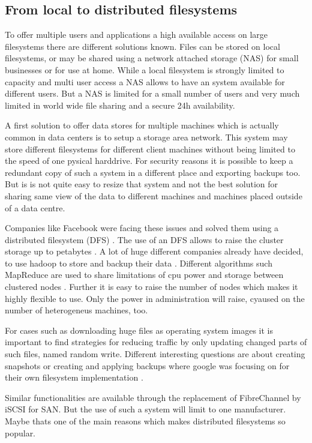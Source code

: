 \subsection{From local to distributed filesystems}

To offer multiple users and applications a high available access on large filesystems there are different solutions known. 
Files can be stored on local filesystems, or may be shared using a network attached storage (NAS) for small businesses or for use at home. 
While a local filesystem is strongly limited to capacity and multi user access a NAS allows to have an system available for different users. 
But a NAS is limited for a small number of users and very much limited in world wide file sharing and a secure 24h availability.

A first solution to offer data stores for multiple machines which is actually common in data centers is to setup a storage area network. 
This system may store different filesystems for different client machines without being limited to the speed of one pysical harddrive. 
For security reasons it is possible to keep a redundant copy of such a system in a different place and exporting backups too. 
But is is not quite easy to resize that system and not the best solution for sharing same view of the data to different machines and machines placed outside of a data centre.

Companies like Facebook were facing these issues and solved them using a distributed filesystem (DFS) \cite{fb-hadoop}. 
The use of an DFS allows to raise the cluster storage  up to petabytes  \cite{fb-hadoop}. 
A lot of huge different companies already have decided, to use hadoop to store and backup their data  \cite{hadoop-poweredby}. 
Different algorithms such MapReduce are used to share limitations of cpu power and storage between clustered nodes \cite{dean2008mapreduce}. 
Further it is easy to raise the number of nodes which makes it highly flexible to use. Only the power in administration will raise, cyaused on the number of heterogeneus machines, too.

For cases such as downloading huge files as operating system images it is important to find strategies for reducing traffic by only updating changed parts of such files, named random write.
Different interesting questions are about creating snapshots or creating and applying backups where google was focusing on for their own filesystem implementation \cite{ghemawat2003google}.

Similar functionalities are available through the replacement of FibreChannel by iSCSI for SAN. But the use of such a system will limit to one manufacturer. Maybe thats one of the main reasons which makes distributed filesystems so popular.

